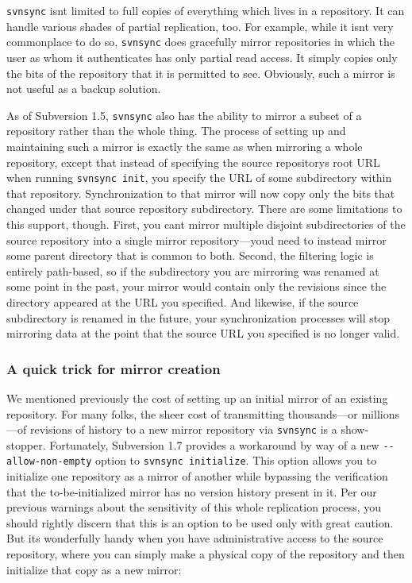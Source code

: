 \texttt{svnsync} isn\textquotesingle t limited to full copies of
everything which lives in a repository. It can handle various shades of
partial replication, too. For example, while it isn\textquotesingle t
very commonplace to do so, \texttt{svnsync} does gracefully mirror
repositories in which the user as whom it authenticates has only partial
read access. It simply copies only the bits of the repository that it is
permitted to see. Obviously, such a mirror is not useful as a backup
solution.

As of Subversion 1.5, \texttt{svnsync} also has the ability to mirror a
subset of a repository rather than the whole thing. The process of
setting up and maintaining such a mirror is exactly the same as when
mirroring a whole repository, except that instead of specifying the
source repository\textquotesingle s root URL when running
\texttt{svnsync\ init}, you specify the URL of some subdirectory within
that repository. Synchronization to that mirror will now copy only the
bits that changed under that source repository subdirectory. There are
some limitations to this support, though. First, you
can\textquotesingle t mirror multiple disjoint subdirectories of the
source repository into a single mirror
repository---you\textquotesingle d need to instead mirror some parent
directory that is common to both. Second, the filtering logic is
entirely path-based, so if the subdirectory you are mirroring was
renamed at some point in the past, your mirror would contain only the
revisions since the directory appeared at the URL you specified. And
likewise, if the source subdirectory is renamed in the future, your
synchronization processes will stop mirroring data at the point that the
source URL you specified is no longer valid.

\subsubsection{A quick trick for mirror
creation}\label{svn.reposadmin.maint.replication.svnsync-init-nonempty}

We mentioned previously the cost of setting up an initial mirror of an
existing repository. For many folks, the sheer cost of transmitting
thousands---or millions---of revisions of history to a new mirror
repository via \texttt{svnsync} is a show-stopper. Fortunately,
Subversion 1.7 provides a workaround by way of a new
\texttt{-\/-allow-non-empty} option to \texttt{svnsync\ initialize}.
This option allows you to initialize one repository as a mirror of
another while bypassing the verification that the to-be-initialized
mirror has no version history present in it. Per our previous warnings
about the sensitivity of this whole replication process, you should
rightly discern that this is an option to be used only with great
caution. But it\textquotesingle s wonderfully handy when you have
administrative access to the source repository, where you can simply
make a physical copy of the repository and then initialize that copy as
a new mirror:

